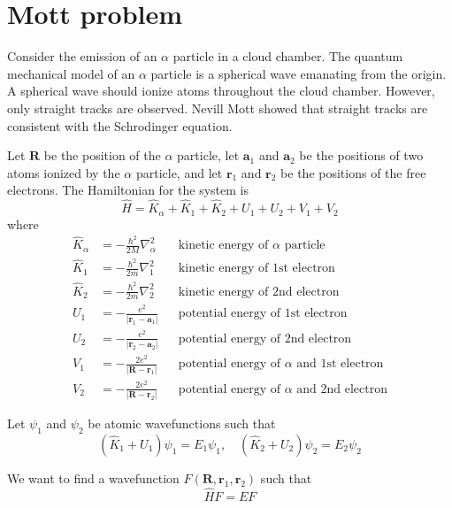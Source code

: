 

\section*{Mott problem}

Consider the emission of an $\alpha$ particle in a cloud chamber.
The quantum mechanical model of an $\alpha$ particle is a spherical
wave emanating from the origin.
A spherical wave should ionize atoms throughout the cloud chamber.
However, only straight tracks are observed.
Nevill Mott showed that straight tracks are consistent with the Schrodinger equation.

\bigskip

Let $\mathbf R$ be the position of the $\alpha$ particle,
let $\mathbf a_1$ and $\mathbf a_2$ be the positions of two atoms ionized by the $\alpha$ particle,
and let $\mathbf r_1$ and $\mathbf r_2$ be the positions of the free electrons.
The Hamiltonian for the system is
\begin{equation*}
\hat H=\hat K_\alpha+\hat K_1+\hat K_2+U_1+U_2+V_1+V_2
\end{equation*}
where
\begin{align*}
\hat K_\alpha&=-\frac{\hbar^2}{2M}\nabla_\alpha^2 & & \text{kinetic energy of $\alpha$ particle}
\\[1ex]
\hat K_1&=-\frac{\hbar^2}{2m}\nabla_1^2 & & \text{kinetic energy of 1st electron}
\\[1ex]
\hat K_2&=-\frac{\hbar^2}{2m}\nabla_2^2 & & \text{kinetic energy of 2nd electron}
\\[1ex]
U_1&=-\frac{e^2}{|\mathbf r_1-\mathbf a_1|} & & \text{potential energy of 1st electron}
\\[1ex]
U_2&=-\frac{e^2}{|\mathbf r_2-\mathbf a_2|} & & \text{potential energy of 2nd electron}
\\[1ex]
V_1&=-\frac{2e^2}{|\mathbf R-\mathbf r_1|} & & \text{potential energy of $\alpha$ and 1st electron}
\\[1ex]
V_2&=-\frac{2e^2}{|\mathbf R-\mathbf r_2|} & & \text{potential energy of $\alpha$ and 2nd electron}
\end{align*}

Let $\psi_1$ and $\psi_2$ be atomic wavefunctions such that
\begin{equation*}
\left(\hat K_1+U_1\right)\psi_1=E_1\psi_1,
\quad
\left(\hat K_2+U_2\right)\psi_2=E_2\psi_2
\end{equation*}

We want to find a wavefunction $F(\mathbf R,\mathbf r_1,\mathbf r_2)$ such that
\begin{equation*}
\hat HF=EF
\end{equation*}

